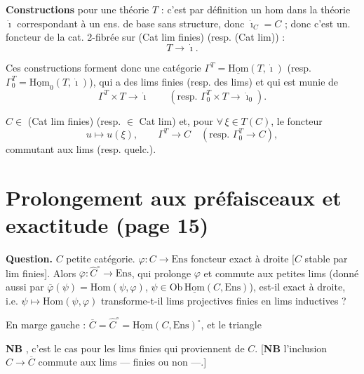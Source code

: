 \documentclass[11pt,a4paper]{article}
\begin{document}

\textbf{Constructions} pour une  théorie $T$ : c'est par
définition un hom dans la théorie $\dot{\imath}$ correspondant à un ens. de
base sans structure, donc $\dot{\imath}_C = C$ ; donc c'est un. foncteur de
la cat. 2-fibrée sur (Cat lim finies) (resp. (Cat lim)) :
\[
T \longrightarrow \dot{\imath}.
\]

Ces constructions forment donc une catégorie
$\Gamma^{T} = \underline{\mathrm{Hom}}(T, \dot{\imath})$ (resp.
$\Gamma_0^{T} = \underline{\mathrm{Hom}}_0(T, \dot{\imath})$), qui a des
lims finies (resp. des lims) et qui est munie de
\[
\Gamma^{T} \times T \longrightarrow \dot{\imath}
\qquad (\text{resp. } \Gamma_0^{T} \times T \to \dot{\imath}_0).
\]

$C \in$ (Cat lim finies) (resp. $\in$ Cat lim) et, pour
$\forall\, \xi \in T(C)$, le foncteur
\[
u \mapsto u(\xi), \qquad \Gamma^{T} \longrightarrow C
\quad (\text{resp. } \Gamma_0^{T} \to C),
\]
commutant aux lims  (resp. quelc.).

\section*{Prolongement aux préfaisceaux et exactitude (page 15)}

\textbf{Question.} $C$ petite catégorie.
$\varphi : C \to \mathrm{Ens}$ foncteur exact à droite [$C$ stable par lim
finies]. Alors $\overline{\varphi} : \widehat{C}^{\circ} \to \mathrm{Ens}$,
qui prolonge $\varphi$ et commute aux petites lims (donné aussi par
$\overline{\varphi}(\psi) = \mathrm{Hom}(\psi, \varphi)$,
$\psi \in \mathrm{Ob}\,\underline{\mathrm{Hom}}(C, \mathrm{Ens})$),
est-il exact à droite, i.e. $\psi \mapsto \mathrm{Hom}(\psi, \varphi)$
transforme-t-il lims projectives finies en lims inductives ?

En marge gauche : $\overline{C} = \widehat{C}^{\circ} =
\underline{\mathrm{Hom}}(C, \mathrm{Ens})^{\circ}$, et le triangle


\textbf{NB} , c'est le cas pour les
lims finies qui proviennent de $C$. [\textbf{NB} l'inclusion
$C \to \overline{C}$ commute aux lims — finies ou non —.]
\end{document}
